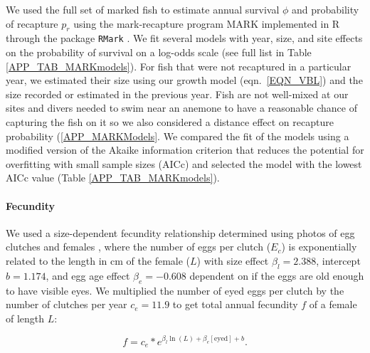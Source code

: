 \documentclass[12pt, oneside]{article}   	%
\begin{document}
We used the full set of marked fish to estimate annual survival $\phi$ and probability of recapture $p_r$ using the mark-recapture program MARK implemented in R through the package \texttt{RMark} \citep{RMark_Laake2013}. We fit several models with year, size, and site effects on the probability of survival on a log-odds scale (see full list in Table \ref{APP_TAB_MARKmodels}). For fish that were not recaptured in a particular year, we estimated their size using our growth model (eqn.\ \ref{EQN_VBL}) and the size recorded or estimated in the previous year. Fish are not well-mixed at our sites and divers needed to swim near an anemone to have a reasonable chance of capturing the fish on it so we also considered a distance effect on recapture probability (\ref{APP_MARKModels}. We compared the fit of the models using a modified version of the Akaike information criterion that reduces the potential for overfitting with small sample sizes (AICc) and selected the model with the lowest AICc value (Table \ref{APP_TAB_MARKmodels}).

\paragraph*{Fecundity}

We used a size-dependent fecundity relationship determined using photos of egg clutches and females \citep{yawdoszynInPrepfecundity}, where the number of eggs per clutch ($E_c$) is exponentially related to the length in cm of the female ($L$) with size effect $\beta_l = 2.388$, intercept $b = 1.174$, and egg age effect $\beta_e = -0.608$ dependent on if the eggs are old enough to have visible eyes. We multiplied the number of eyed eggs per clutch by the number of clutches per year $c_e = 11.9$ \citep[estimate from][]{holtswarth2017fecundity} to get total annual fecundity $f$ of a female of length $L$:

\begin{equation}
f = c_e * e^{\beta_l\ln(L) + \beta_e[\text{eyed}] + b}. \label{EQN_Fec}
\end{equation}

\end{document}
